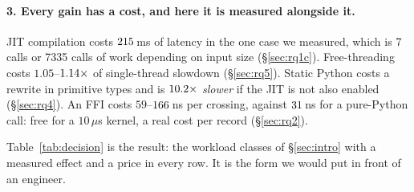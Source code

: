 \paragraph{3. Every gain has a cost, and here it is measured alongside it.}
JIT compilation costs $\meas{fact:b1_breakeven-314:facts.numba_compile_s:ms}{215}$\,ms of latency in the one case we measured, which is 7 calls or 7335
calls of work depending on input size (\S\ref{sec:rq1c}). Free-threading costs $1.05$--$\meas{ratio:b4_threads-ft:single_thread_arith/ft|b4_threads-gil:single_thread_arith/gil}{1.14}\times$ of
single-thread slowdown (\S\ref{sec:rq5}). Static Python costs a rewrite in primitive types
and is $\meas{ratio:b6_static-fork_static:matmul96_int/fork_static/static_interp|b6_static-fork_static:matmul96_int/fork_static/boxed_python}{10.2}\times$ \emph{slower} if the JIT is not also enabled (\S\ref{sec:rq4}). An FFI costs
$59$--$\meas{med:b1_compute-314:call_overhead/c_ctypes:ns}{166}$\,ns per crossing, against $\meas{med:b1_compute-314:call_overhead/python_function:ns}{31}$\,ns for a pure-Python call: free for a $10\,\mu$s
kernel, a real cost per record (\S\ref{sec:rq2}).

\medskip
Table~\ref{tab:decision} is the result: the workload classes of \S\ref{sec:intro} with a
measured effect and a price in every row. It is the form we would put in front of an engineer.

